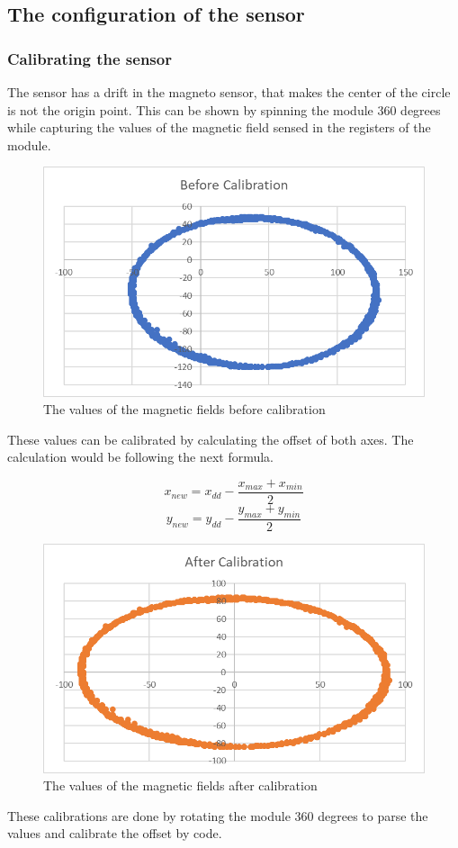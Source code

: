 \subsection{The configuration of the sensor}
\subsubsection{Calibrating the sensor}
The sensor has a drift in the magneto sensor, that makes the center of the circle is not the origin point.
This can be shown by spinning the module 360 degrees while capturing the values of the magnetic field sensed in the registers of the module.
\clearpage
\begin{figure}[h]
    \centering
    \includegraphics[scale=.3]{figures/4.png}
    \caption{The values of the magnetic fields before calibration}
\end{figure}
These values can be calibrated by calculating the offset of both axes.
The calculation would be following the next formula.

\[x_{new} = x_{dd} - \frac{x_{max} + x_{min}}{2} \]
\[y_{new} = y_{dd} - \frac{y_{max} + y_{min}}{2} \]

\begin{figure}[h]
    \centering
    \includegraphics[scale=.3]{figures/5.png}
    \caption{The values of the magnetic fields after calibration}
\end{figure}
These calibrations are done by rotating the module 360 degrees to parse the values and calibrate the offset by code.

